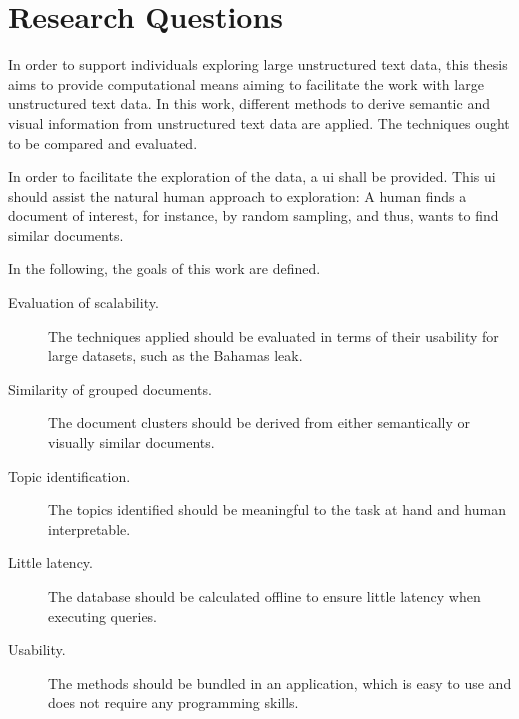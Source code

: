 \section{Research Questions}\label{sec:research-questions}

In order to support individuals exploring large unstructured text data, this thesis aims to provide computational means aiming to facilitate the work with large unstructured text data.
In this work, different methods to derive semantic and visual information from unstructured text data are applied.
The techniques ought to be compared and evaluated.

In order to facilitate the exploration of the data, a \ac{ui} shall be provided.
This \ac{ui} should assist the natural human approach to exploration:
A human finds a document of interest, for instance, by random sampling, and thus, wants to find similar documents.

In the following, the goals of this work are defined.
\begin{description}
    \item[Evaluation of scalability.]
    The techniques applied should be evaluated in terms of their usability for large datasets, such as the Bahamas leak.
    \item[Similarity of grouped documents.]
    The document clusters should be derived from either semantically or visually similar documents.
    \item[Topic identification.]
    The topics identified should be meaningful to the task at hand and human interpretable.  
    \item[Little latency.]
    The database should be calculated offline to ensure little latency when executing queries.
    \item[Usability.]
    The methods should be bundled in an application, which is easy to use and does not require any programming skills.
\end{description}